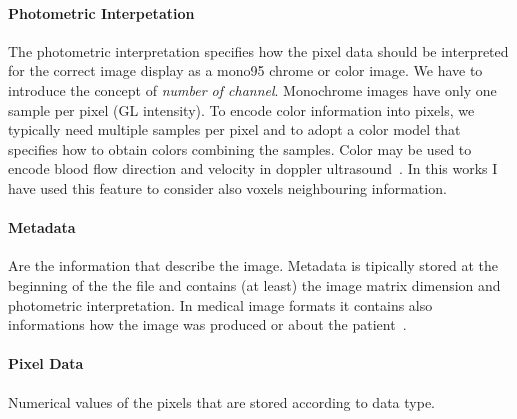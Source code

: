 \documentclass{standalone}
\begin{document}
	\paragraph{Photometric Interpetation} The photometric interpretation specifies how the pixel data should be interpreted for the correct image display as a mono95 chrome or color image. We have to introduce the concept of \emph{number of channel}. Monochrome images have only one sample per pixel (GL intensity). To encode color information into pixels, we typically need multiple samples per pixel and to adopt a color model that specifies how to obtain colors combining the samples. Color may be used to encode blood flow direction and velocity in doppler ultrasound~\cite{ART:Larobina}. In this works I have used this feature to consider also voxels neighbouring information. 
	
	\paragraph{Metadata} Are the information that describe the image. Metadata is tipically stored at the beginning of the the file and contains (at least) the image matrix dimension and photometric interpretation. In medical image formats it contains also informations how the image was produced or about the patient~\cite{ART:Larobina}.
	
	\paragraph{Pixel Data} Numerical values of the pixels that are stored according to data type. 
			
\end{document}
